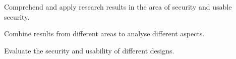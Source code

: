 \item Comprehend and apply research results in the area of security and usable 
  security.

\item Combine results from different areas to analyse different aspects.

\item Evaluate the security and usability of different designs.
